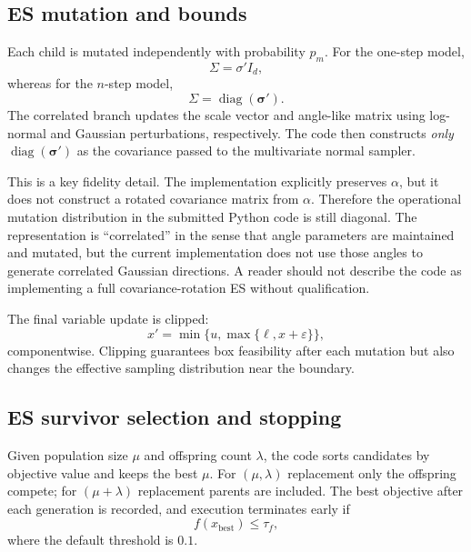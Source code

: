 \documentclass[11pt,a4paper]{article}
\newcommand{\diag}{\operatorname{diag}}
\begin{document}
\subsection{ES mutation and bounds}
Each child is mutated independently with probability $p_m$. For the one-step model,
\begin{equation}
\Sigma=\sigma' I_d,
\end{equation}
whereas for the $n$-step model,
\begin{equation}
\Sigma=\operatorname{diag}(\boldsymbol{\sigma}').
\end{equation}
The correlated branch updates the scale vector and angle-like matrix using log-normal and Gaussian perturbations, respectively. The code then constructs \emph{only} $\diag(\boldsymbol{\sigma}')$ as the covariance passed to the multivariate normal sampler.

This is a key fidelity detail. The implementation explicitly preserves $\alpha$, but it does not construct a rotated covariance matrix from $\alpha$. Therefore the operational mutation distribution in the submitted Python code is still diagonal. The representation is ``correlated'' in the sense that angle parameters are maintained and mutated, but the current implementation does not use those angles to generate correlated Gaussian directions. A reader should not describe the code as implementing a full covariance-rotation ES without qualification.

The final variable update is clipped:
\begin{equation}
x' = \min\{u,\max\{\ell,x+\varepsilon\}\},
\end{equation}
componentwise. Clipping guarantees box feasibility after each mutation but also changes the effective sampling distribution near the boundary.

\subsection{ES survivor selection and stopping}
Given population size $\mu$ and offspring count $\lambda$, the code sorts candidates by objective value and keeps the best $\mu$. For $(\mu,\lambda)$ replacement only the offspring compete; for $(\mu+\lambda)$ replacement parents are included. The best objective after each generation is recorded, and execution terminates early if
\begin{equation}
f(x_{\mathrm{best}})\leq \tau_f,
\end{equation}
where the default threshold is $0.1$.
\end{document}
